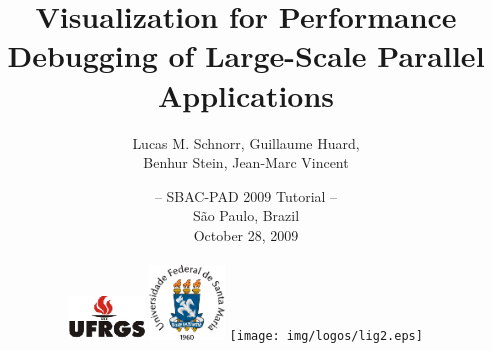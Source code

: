 \documentclass{beamer}
\title{Visualization for Performance Debugging of
Large-Scale Parallel Applications}
\author{Lucas M. Schnorr, Guillaume Huard, \\
Benhur Stein, Jean-Marc Vincent}
\date{
-- SBAC-PAD 2009 Tutorial -- \\
S\~ao Paulo, Brazil\\
October 28, 2009\\
\ \\
\includegraphics[width=2cm]{img/logos/ufrgs.eps}\hfill
\includegraphics[width=2cm]{img/logos/ufsm.eps}\hfill
\texttt{[image: img/logos/lig2.eps]}}
\begin{document}
\frame{\titlepage}


\section[Outline]{}
\frame{\tableofcontents}




\end{document}
